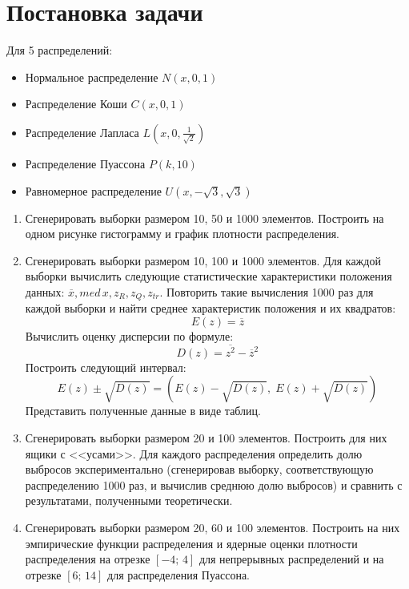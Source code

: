 \documentclass[a4paper]{article}
\begin{document}

\tableofcontents
{}
\newpage
\listoffigures
{}
\newpage
\listoftables
{}
\newpage
\section{Постановка задачи}
Для 5 распределений:
\begin{itemize}
    \item Нормальное распределение $N(x, 0, 1)$
    \item Распределение Коши $C(x, 0, 1)$
    \item Распределение Лапласа $L(x, 0, \frac{1}{\sqrt{2}})$
    \item Распределение Пуассона $P(k, 10)$
    \item Равномерное распределение $U(x,-\sqrt{3},\sqrt{3})$
\end{itemize}
\begin{enumerate}
    \item Сгенерировать выборки размером 10, 50 и 1000 элементов. Построить на одном рисунке гистограмму и график плотности распределения.
    \item Сгенерировать выборки размером 10, 100 и 1000 элементов.
    Для каждой выборки вычислить следующие статистические характеристики положения данных: $\overline{x}, med\,x, z_R, z_Q, z_{tr}$. Повторить такие вычисления 1000 раз для каждой выборки и найти среднее характеристик положения и их квадратов:
    \begin{equation}\label{mean_formula}
        E(z)=\overline{z}
    \end{equation}
    Вычислить оценку дисперсии по формуле:
    \begin{equation}\label{variance_formula}
        D(z)=\overline{z^2}-\overline{z}^2
    \end{equation}
    Построить следующий интервал:
    \begin{equation}\label{confint}
        E(z)\pm\sqrt{D(z)}=\left(E(z)-\sqrt{D(z)},\;E(z)+\sqrt{D(z)}\right)
    \end{equation}
    Представить полученные данные в виде таблиц.
    \item Сгенерировать выборки размером 20 и 100 элементов. Построить для них ящики с <<усами>>. Для каждого распределения определить долю выбросов экспериментально (сгенерировав выборку, соответствующую распределению 1000 раз, и вычислив среднюю долю выбросов) и сравнить с результатами, полученными теоретически.
    \item Сгенерировать выборки размером 20, 60 и 100 элементов. Построить на них эмпирические функции распределения и ядерные оценки плотности распределения на отрезке $[-4;\,4]$ для непрерывных распределений и на отрезке $[6;\,14]$ для распределения Пуассона.
\end{enumerate}
\end{document}
